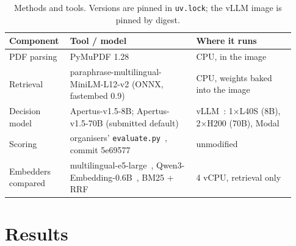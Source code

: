 \documentclass[10pt,a4paper]{article}
\begin{document}
\begin{table}[h]
\centering\small
\begin{tabular}{@{}L{0.18\linewidth}L{0.42\linewidth}L{0.33\linewidth}@{}}
\toprule
Component & Tool / model & Where it runs \\
\midrule
PDF parsing & PyMuPDF 1.28 & CPU, in the image \\
Retrieval & paraphrase-multilingual-MiniLM-L12-v2 (ONNX, fastembed 0.9) & CPU, weights baked into the image \\
Decision model & Apertus-v1.5-8B; Apertus-v1.5-70B (submitted default) & vLLM~\cite{kwon2023vllm}: 1$\times$L40S (8B), 2$\times$H200 (70B), Modal \\
Scoring & organisers' \texttt{evaluate.py}~\cite{starter}, commit 5e69577 & unmodified \\
Embedders compared & multilingual-e5-large~\cite{wang2024e5}, Qwen3-Embedding-0.6B~\cite{zhang2025qwen3emb}, BM25 + RRF~\cite{robertson2009bm25,cormack2009rrf} & 4 vCPU, retrieval only \\
\bottomrule
\end{tabular}
\caption{Methods and tools. Versions are pinned in \texttt{uv.lock}; the vLLM image is pinned by digest.}
\label{tab:tools}
\end{table}

\section{Results}
\end{document}
